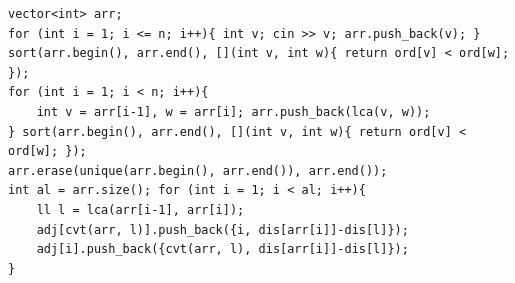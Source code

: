 \begin{verbatim}
vector<int> arr;
for (int i = 1; i <= n; i++){ int v; cin >> v; arr.push_back(v); }
sort(arr.begin(), arr.end(), [](int v, int w){ return ord[v] < ord[w]; });
for (int i = 1; i < n; i++){
	int v = arr[i-1], w = arr[i]; arr.push_back(lca(v, w));
} sort(arr.begin(), arr.end(), [](int v, int w){ return ord[v] < ord[w]; });
arr.erase(unique(arr.begin(), arr.end()), arr.end());
int al = arr.size(); for (int i = 1; i < al; i++){
	ll l = lca(arr[i-1], arr[i]);
	adj[cvt(arr, l)].push_back({i, dis[arr[i]]-dis[l]});
	adj[i].push_back({cvt(arr, l), dis[arr[i]]-dis[l]});
}
\end{verbatim}